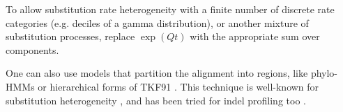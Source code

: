 \documentclass{article}
\begin{document}
To allow substitution rate heterogeneity
with a finite number of discrete rate categories
(e.g. deciles of a gamma distribution),
or another mixture of substitution processes,
replace $\exp(Qt)$ with the appropriate sum over components.

One can also use models that partition the alignment into regions, like phylo-HMMs \cite{WestessonHolmes2012}
or hierarchical forms of TKF91 \cite{Holmes2004}.
This technique is well-known for substitution heterogeneity \cite{Yang95}, and has been tried for indel profiling too \cite{SatijaEtAl2010}.



\end{document}
